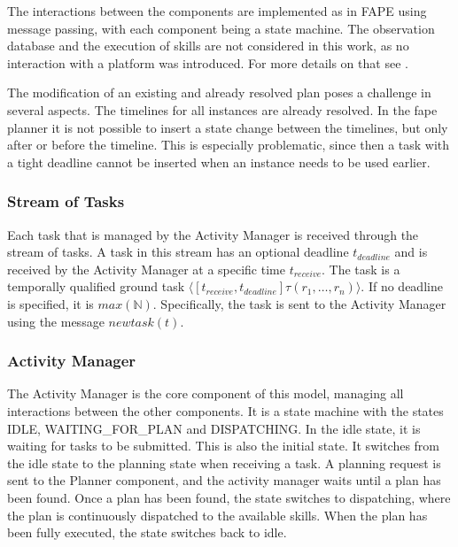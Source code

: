 
The interactions between the components are implemented as in FAPE using message passing, with each component being a state machine.
The observation database and the execution of skills are not considered in this work, as no interaction with a platform was introduced.
For more details on that see \cite{bit-monnotTemporalHierarchicalModels2016a}.

The modification of an existing and already resolved plan poses a challenge in several aspects.
The timelines for all instances are already resolved.
In the fape planner it is not possible to insert a state change between the timelines, but only after or before the timeline.
This is especially problematic, since then a task with a tight deadline cannot be inserted when an instance needs to be used earlier.

\subsubsection{Stream of Tasks}

Each task that is managed by the Activity Manager is received through the stream of tasks.
A task in this stream has an optional deadline $t_{deadline}$ and is received by the Activity Manager at a specific time $t_{receive}$.
The task is a temporally qualified ground task $\langle[t_{receive},t_{deadline}] \tau(r_1,\dots,r_n)\rangle$.
If no deadline is specified, it is $max(\mathbb{N})$.
Specifically, the task is sent to the Activity Manager using the message $newtask(t)$.

\subsubsection{Activity Manager}

The Activity Manager is the core component of this model, managing all interactions between the other components.
It is a state machine with the states IDLE, WAITING\_FOR\_PLAN and DISPATCHING.
In the idle state, it is waiting for tasks to be submitted.
This is also the initial state.
It switches from the idle state to the planning state when receiving a task.
A planning request is sent to the Planner component, and the activity manager waits until a plan has been found.
Once a plan has been found, the state switches to dispatching, where the plan is continuously dispatched to the available skills.
When the plan has been fully executed, the state switches back to idle.

